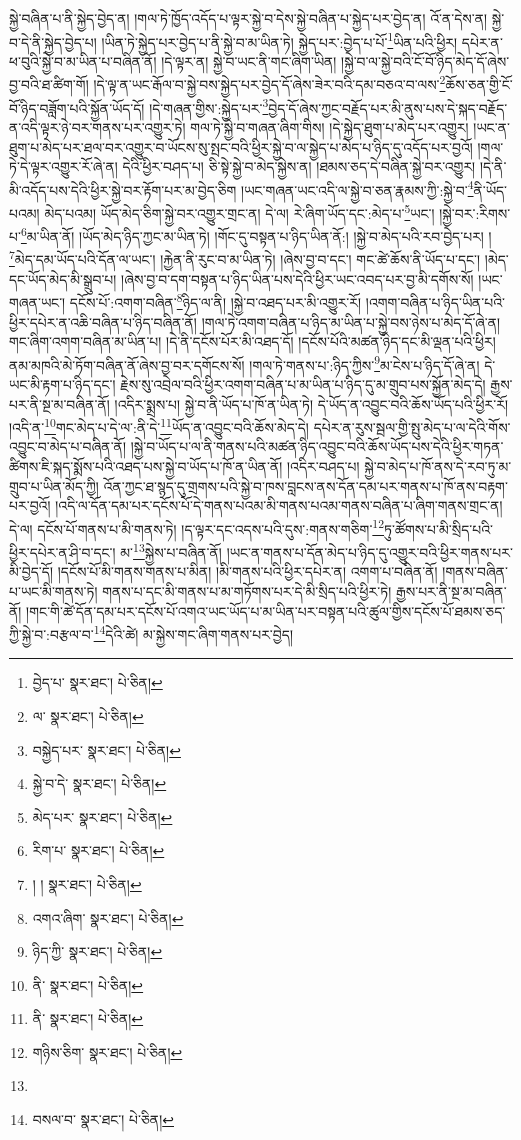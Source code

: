 སྐྱེ་བཞིན་པ་ནི་སྐྱེད་བྱེད་ན། །གལ་ཏེ་ཁྱོད་འདོད་པ་ལྟར་སྐྱེ་བ་དེས་སྐྱེ་བཞིན་པ་སྐྱེད་པར་བྱེད་ན། འོ་ན་དེས་ན། སྐྱེ་བ་དེ་ནི་སྐྱེད་བྱེད་པ། །ཡིན་ཏེ་སྐྱེད་པར་བྱེད་པ་ནི་སྐྱེ་བ་མ་ཡིན་ཏེ། སྐྱེད་པར་:བྱེད་པ་པོ་\footnote{བྱེད་པ་  སྣར་ཐང་།  པེ་ཅིན། }ཡིན་པའི་ཕྱིར། དཔེར་ན་ཕ་བུའི་སྐྱེ་བ་མ་ཡིན་པ་བཞིན་ནོ། །དེ་ལྟར་ན། སྐྱེ་བ་ཡང་ནི་གང་ཞིག་ཡིན། །སྐྱེ་བ་ལ་སྐྱེ་བའི་ངོ་བོ་ཉིད་མེད་དོ་ཞེས་བྱ་བའི་ཐ་ཚིག་གོ། །དེ་ལྟ་ན་ཡང་རྒོལ་བ་སྐྱེ་བས་སྐྱེད་པར་བྱེད་དོ་ཞེས་ཟེར་བའི་དམ་བཅའ་བ་ལས་\footnote{ལ་  སྣར་ཐང་།  པེ་ཅིན། }ཆོས་ཅན་གྱི་ངོ་བོ་ཉིད་བཟློག་པའི་སྐྱོན་ཡོད་དོ། །དེ་གཞན་གྱིས་:སྐྱེད་པར་\footnote{བསྐྱེད་པར་  སྣར་ཐང་།  པེ་ཅིན། }བྱེད་དོ་ཞེས་ཀྱང་བརྗོད་པར་མི་ནུས་པས་དེ་སྐད་བརྗོད་ན་འདི་ལྟར་ཉེ་བར་གནས་པར་འགྱུར་ཏེ། གལ་ཏེ་སྐྱེ་བ་གཞན་ཞིག་གིས། །དེ་སྐྱེད་ཐུག་པ་མེད་པར་འགྱུར། །ཡང་ན་ཐུག་པ་མེད་པར་ཐལ་བར་འགྱུར་བ་ཡོངས་སུ་སྤང་བའི་ཕྱིར་སྐྱེ་བ་ལ་སྐྱེད་པ་མེད་པ་ཉིད་དུ་འདོད་པར་བྱའོ། །གལ་ཏེ་དེ་ལྟར་འགྱུར་རོ་ཞེ་ན། དེའི་ཕྱིར་བཤད་པ། ཅི་སྟེ་སྐྱེ་བ་མེད་སྐྱེས་ན། །ཐམས་ཅད་དེ་བཞིན་སྐྱེ་བར་འགྱུར། །དེ་ནི་མི་འདོད་པས་དེའི་ཕྱིར་སྐྱེ་བར་རྟོག་པར་མ་བྱེད་ཅིག །ཡང་གཞན་ཡང་འདི་ལ་སྐྱེ་བ་ཅན་རྣམས་ཀྱི་:སྐྱེ་བ་\footnote{སྐྱེ་བ་དེ་  སྣར་ཐང་།  པེ་ཅིན། }ནི་ཡོད་པའམ། མེད་པའམ། ཡོད་མེད་ཅིག་སྐྱེ་བར་འགྱུར་གྲང་ན། དེ་ལ། རེ་ཞིག་ཡོད་དང་:མེད་པ་\footnote{མེད་པར་  སྣར་ཐང་།  པེ་ཅིན། }ཡང་། །སྐྱེ་བར་:རིགས་པ་\footnote{རིག་པ་  སྣར་ཐང་།  པེ་ཅིན། }མ་ཡིན་ནོ། །ཡོད་མེད་ཉིད་ཀྱང་མ་ཡིན་ཏེ། །གོང་དུ་བསྟན་པ་ཉིད་ཡིན་ནོ:། །སྐྱེ་བ་མེད་པའི་རབ་བྱེད་པར། །\footnote{། །  སྣར་ཐང་།  པེ་ཅིན། }མེད་དམ་ཡོད་པའི་དོན་ལ་ཡང་། །རྐྱེན་ནི་རུང་བ་མ་ཡིན་ཏེ། །ཞེས་བྱ་བ་དང་། གང་ཚེ་ཆོས་ནི་ཡོད་པ་དང་། །མེད་དང་ཡོད་མེད་མི་སྒྲུབ་པ། །ཞེས་བྱ་བ་དག་བསྟན་པ་ཉིད་ཡིན་པས་དེའི་ཕྱིར་ཡང་འབད་པར་བྱ་མི་དགོས་སོ། །ཡང་གཞན་ཡང་། དངོས་པོ་:འགག་བཞིན་\footnote{འགའ་ཞིག་  སྣར་ཐང་།  པེ་ཅིན། }ཉིད་ལ་ནི། །སྐྱེ་བ་འཐད་པར་མི་འགྱུར་རོ། །འགག་བཞིན་པ་ཉིད་ཡིན་པའི་ཕྱིར་དཔེར་ན་འཆི་བཞིན་པ་ཉིད་བཞིན་ནོ། །གལ་ཏེ་འགག་བཞིན་པ་ཉིད་མ་ཡིན་པ་སྐྱེ་བས་ཉེས་པ་མེད་དོ་ཞེ་ན། གང་ཞིག་འགག་བཞིན་མ་ཡིན་པ། །དེ་ནི་དངོས་པོར་མི་འཐད་དོ། །དངོས་པོའི་མཚན་ཉིད་དང་མི་ལྡན་པའི་ཕྱིར། ནམ་མཁའི་མེ་ཏོག་བཞིན་ནོ་ཞེས་བྱ་བར་དགོངས་སོ། །གལ་ཏེ་གནས་པ་:ཉིད་ཀྱིས་\footnote{ཉིད་ཀྱི་  སྣར་ཐང་།  པེ་ཅིན། }མ་ངེས་པ་ཉིད་དོ་ཞེ་ན། དེ་ཡང་མི་རྟག་པ་ཉིད་དང་། རྗེས་སུ་འབྲེལ་བའི་ཕྱིར་འགག་བཞིན་པ་མ་ཡིན་པ་ཉིད་དུ་མ་གྲུབ་པས་སྐྱོན་མེད་དེ། རྒྱས་པར་ནི་སྔ་མ་བཞིན་ནོ། །འདིར་སྨྲས་པ། སྐྱེ་བ་ནི་ཡོད་པ་ཁོ་ན་ཡིན་ཏེ། དེ་ཡོད་ན་འབྱུང་བའི་ཆོས་ཡོད་པའི་ཕྱིར་རོ། །འདི་ན་\footnote{ནི་  སྣར་ཐང་།  པེ་ཅིན། }གང་མེད་པ་དེ་ལ་:ནི་དེ་\footnote{ནི་  སྣར་ཐང་།  པེ་ཅིན། }ཡོད་ན་འབྱུང་བའི་ཆོས་མེད་དེ། དཔེར་ན་རུས་སྦལ་གྱི་སྤུ་མེད་པ་ལ་དེའི་གོས་འབྱུང་བ་མེད་པ་བཞིན་ནོ། །སྐྱེ་བ་ཡོད་པ་ལ་ནི་གནས་པའི་མཚན་ཉིད་འབྱུང་བའི་ཆོས་ཡོད་པས་དེའི་ཕྱིར་གཏན་ཚིགས་ཇི་སྐད་སྨོས་པའི་འཐད་པས་སྐྱེ་བ་ཡོད་པ་ཁོ་ན་ཡིན་ནོ། །འདིར་བཤད་པ། སྐྱེ་བ་མེད་པ་ཁོ་ནས་དེ་རབ་ཏུ་མ་གྲུབ་པ་ཡིན་མོད་ཀྱི། འོན་ཀྱང་ཐ་སྙད་དུ་གྲགས་པའི་སྐྱེ་བ་ཁས་བླངས་ནས་དོན་དམ་པར་གནས་པ་ཁོ་ནས་བརྟག་པར་བྱའོ། །འདི་ལ་དོན་དམ་པར་དངོས་པོ་དེ་གནས་པའམ་མི་གནས་པའམ་གནས་བཞིན་པ་ཞིག་གནས་གྲང་ན། དེ་ལ། དངོས་པོ་གནས་པ་མི་གནས་ཏེ། །ད་ལྟར་དང་འདས་པའི་དུས་:གནས་གཅིག་\footnote{གཉིས་ཅིག་  སྣར་ཐང་།  པེ་ཅིན། }ཏུ་ཚོགས་པ་མི་སྲིད་པའི་ཕྱིར་དཔེར་ན་ཤི་བ་དང་། མ་\footnote{}སྐྱེས་པ་བཞིན་ནོ། །ཡང་ན་གནས་པ་དོན་མེད་པ་ཉིད་དུ་འགྱུར་བའི་ཕྱིར་གནས་པར་མི་བྱེད་དོ། །དངོས་པོ་མི་གནས་གནས་པ་མིན། །མི་གནས་པའི་ཕྱིར་དཔེར་ན། འགག་པ་བཞིན་ནོ། །གནས་བཞིན་པ་ཡང་མི་གནས་ཏེ། གནས་པ་དང་མི་གནས་པ་མ་གཏོགས་པར་དེ་མི་སྲིད་པའི་ཕྱིར་ཏེ། རྒྱས་པར་ནི་སྔ་མ་བཞིན་ནོ། །གང་གི་ཚེ་དོན་དམ་པར་དངོས་པོ་འགའ་ཡང་ཡོད་པ་མ་ཡིན་པར་བསྟན་པའི་ཚུལ་གྱིས་དངོས་པོ་ཐམས་ཅད་ཀྱི་སྐྱེ་བ་:བརྩལ་བ་\footnote{བསལ་བ་  སྣར་ཐང་།  པེ་ཅིན། }དེའི་ཚེ། མ་སྐྱེས་གང་ཞིག་གནས་པར་བྱེད། 